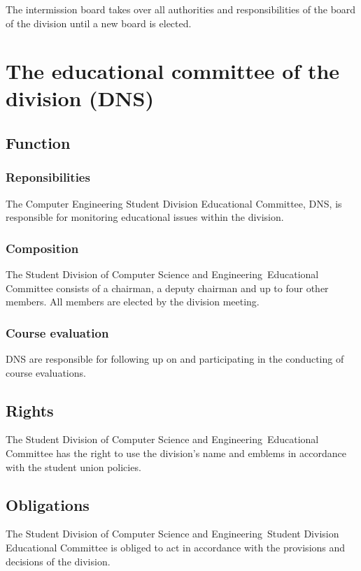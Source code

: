 \documentclass[a4paper]{dtek}
\newcommand{\sdocsae}{Student Division of Computer Science and Engineering~}
\begin{document}
\subsubsection{}
The intermission board takes over all authorities and responsibilities of the  board of the division until a new board is elected. 

\newpage

\section{The educational committee of the division (DNS)}
\subsection{Function}
\subsubsection{Reponsibilities}
The Computer Engineering Student Division Educational Committee, DNS, is responsible for monitoring educational issues within the division. 

\subsubsection{Composition}
The \sdocsae Educational Committee consists of a chairman, a deputy chairman and up to four other members. All members are elected by the division meeting. 

\subsubsection{Course evaluation}
DNS are responsible for following up on and participating in the conducting of course evaluations. 

\subsection{Rights}
The \sdocsae Educational Committee has the right to use the division's name and emblems in accordance with the student union policies. 

\subsection{Obligations}
The \sdocsae Student Division Educational Committee is obliged to act in accordance with the provisions and decisions of the division. 
\end{document}
